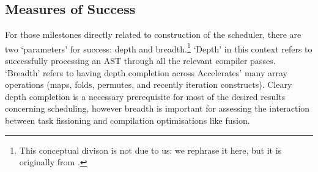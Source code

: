 \documentclass[a4paper,12pt]{article}
\begin{document}
\subsection{Measures of Success}
For those milestones directly related to construction of the scheduler, there are two `parameters' for success: depth and breadth.\footnote{This conceptual divison is not due to us: we rephrase it here, but it is originally from \citet{newton_converting_2014}.} 
`Depth' in this context refers to successfully processing an AST through all the relevant compiler passes. 
`Breadth' refers to having depth completion across Accelerates' many array operations (maps, folds, permutes, and recently iteration constructs).
Cleary depth completion is a necessary prerequisite for most of the desired results concerning scheduling, however breadth is important for assessing the interaction between task fissioning and compilation optimisations like fusion.

\pagebreak

\footnotesize



\end{document}
